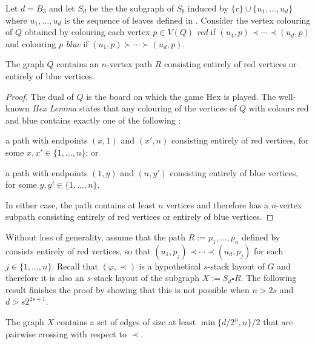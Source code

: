 \documentclass[kpfonts]{patmorin}
\begin{document}
Let $d=B_3$ and let $S_d$ be the the subgraph of $S_b$ induced by $\{r\}\cup\{u_1,\ldots,u_{d}\}$ where $u_1,\ldots,u_d$ is the sequence of leaves defined in .  Consider the vertex colouring of $Q$ obtained by colouring each vertex $p\in V(Q)$ \emph{red} if $(u_1,p)\prec\cdots\prec (u_d,p)$ and colouring $p$ \emph{blue} if $(u_1,p)\succ\cdots\succ(u_d,p)$.

\begin{lem}
    The graph $Q$ contains an $n$-vertex path $R$ consisting entirely of red vertices or entirely of blue vertices.
\end{lem}

\begin{proof}
    The dual of $Q$ is the board on which the game Hex is played.  The well-known \emph{Hex Lemma} states that any colouring of the vertices of $Q$ with colours red and blue contains exactly one of the following \cite{hex_lemma}:
    \begin{compactenum}
        \item a path with endpoints $(x,1)$ and $(x',n)$ consisting entirely of red vertices, for some $x,x'\in\{1,\ldots,n\}$; or
        \item a path with endpoints $(1,y)$ and $(n,y')$ consisting entirely of blue vertices, for some $y,y'\in\{1,\ldots,n\}$.
    \end{compactenum}
    In either case, the path contains at least $n$ vertices and therefore has a $n$-vertex subpath consisting entirely of red vertices or entirely of blue vertices.
\end{proof}

Without loss of generality, assume that the path $R:=p_1,\ldots,p_n$ defined by  consists entirely of red vertices, so that $(u_1,p_j)\prec\cdots\prec (u_d,p_j)$ for each $j\in\{1,\ldots,n\}$.
Recall that $(\varphi,\prec)$ is a hypothetical $s$-stack layout of $G$ and therefore it is also an $s$-stack layout of the subgraph $X:=S_d\square R$.  The following result finishes the proof by showing that this is not possible when $n> 2s$ and $d> s2^{2s+1}$.

\begin{lem}
    The graph $X$ contains a set of edges of size at least $\min\{d/2^{n},n\}/2$ that are pairwise crossing with respect to $\prec$.
\end{lem}
\end{document}
